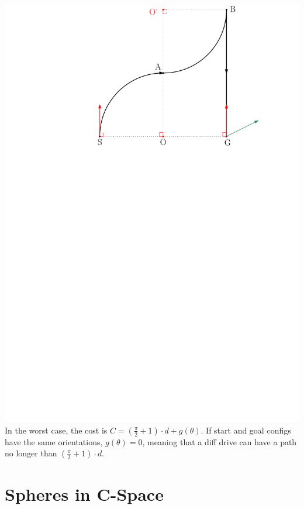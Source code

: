 \documentclass[12pt]{article}
\newtheorem{theorem}{Theorem}[section]
\begin{document}
  \includegraphics[scale=0.8]{Diff_Drive_Worst_Case}\\
  
  In the worst case, the cost is $C = (\frac{\pi}{2} + 1) \cdot d + g(\theta)$. If start and goal configs have the same orientations, $g(\theta) = 0$, meaning that a diff drive can have a path no longer than $(\frac{\pi}{2} + 1) \cdot d$.
  
  \section{Spheres in C-Space}
  
\end{document}
